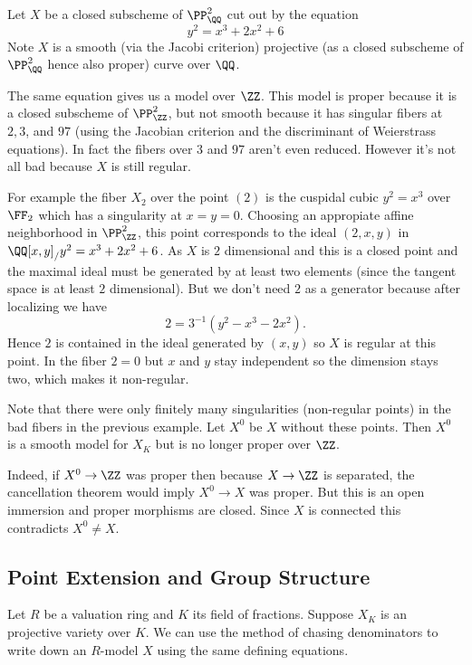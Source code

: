 \documentclass[11pt]{article}
\begin{document}
\begin{ex}
	Let $X$ be a closed subscheme of $\PP^2_\QQ$ cut out by the equation
	$$
		y^2 = x^3 + 2x^2 + 6
	$$
	Note $X$ is a smooth (via the Jacobi criterion) projective (as a closed subscheme of $\PP^2_\QQ$ hence also proper) curve over $\QQ$.
	
	The same equation gives us a model over $\ZZ$. This model is proper because it is a closed subscheme of $\PP^2_\ZZ$, but not smooth because it has singular fibers at $2,3$, and $97$ (using the Jacobian criterion and the discriminant of Weierstrass equations). In fact the fibers over $3$ and $97$ aren't even reduced. However it's not all bad because $X$ is still regular.
	
	For example the fiber $X_2$ over the point $(2)$ is the cuspidal cubic $y^2 = x^3$ over $\FF_2$ which has a singularity at $x=y=0$. Choosing an appropiate affine neighborhood in $\PP^2_\ZZ$, this point corresponds to the ideal $(2,x,y)$ in $\QQ[x,y]_/y^2=x^3+2x^2+6$. As $X$ is $2$ dimensional and this is a closed point and the maximal ideal must be generated by at least two elements (since the tangent space is at least $2$ dimensional). But we don't need $2$ as a generator because after localizing we have
	$$
	2 = 3^{-1}(y^2 - x^3 - 2x^2).
	$$
	Hence $2$ is contained in the ideal generated by $(x,y)$ so $X$ is regular at this point. In the fiber $2=0$ but $x$ and $y$ stay independent so the dimension stays two, which makes it non-regular.
\end{ex}

\begin{ex}
	Note that there were only finitely many singularities (non-regular points) in the bad fibers in the previous example. Let $X^0$ be $X$ without these points. Then $X^0$ is a smooth model for $X_K$ but is no longer proper over $\ZZ$.
	
	Indeed, if $X^0 \to \ZZ$ was proper then because $X \to \ZZ$ is separated, the cancellation theorem would imply $X^0 \to X$ was proper. But this is an open immersion and proper morphisms are closed. Since $X$ is connected this contradicts $X^0 \neq X$.
\end{ex}

\subsection{Point Extension and Group Structure}

Let $R$ be a valuation ring and $K$ its field of fractions. Suppose $X_K$ is an projective variety over $K$. We can use the method of chasing denominators to write down an $R$-model $X$ using the same defining equations.
\end{document}
